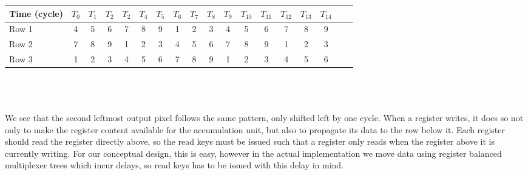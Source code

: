 \begin{tabular}{l*{16}{c}r}
    Time (cycle)        & $T_{0}$ & $T_{1}$ & $T_{2}$ & $T_{2}$ & $T_{4}$  & $T_{5}$ & $T_{6}$ & $T_{7}$ & $T_{8}$ & $T_{9}$ & $T_{10}$ & $T_{11}$ & $T_{12}$ & $T_{13}$ & $T_{14}$\\
\hline
Row 1                   & \cellcolor{gray75} 4 & 5 & 6 & 7 & 8 & 9 & 1 & \cellcolor{gray75} 2 & \cellcolor{gray75} 3 & 4\cellcolor{gray75} & 5 & 6 & 7 & 8 & 9 & \\
Row 2                   & 7 & 8 & 9 & 1 & \cellcolor{gray75} 2 & \cellcolor{gray75} 3 & \cellcolor{gray75}4 & 5 & 6 & 7 & 8 & 9 & 1 & \cellcolor{gray75} 2 & \cellcolor{gray75} 3 & \\
Row 3                   & 1 & \cellcolor{gray75} 2 & \cellcolor{gray75} 3 & 4\cellcolor{gray75} & 5 & 6 & 7 & 8 & 9 & 1 & \cellcolor{gray75} 2 & \cellcolor{gray75} 3 & 4\cellcolor{gray75} & 5 & 6 & \\
\end{tabular}\\ \\ \\
We see that the second leftmost output pixel follows the same pattern, only shifted left by one cycle.
When a register writes, it does so not only to make the register content available for the accumulation unit, but also to propagate its data to the row below it.
Each register should read the register directly above, so the read keys must be issued such that a register only reads when the register above it is currently writing.
For our conceptual design, this is easy, however in the actual implementation we move data using register balanced multiplexer trees which incur delays, so read keys has to be issued with this delay in mind.

